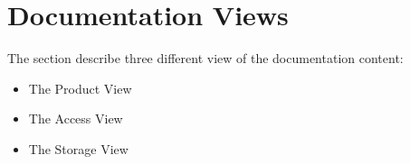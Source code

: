 \section{Documentation Views}
\label{sec:views}

The section describe three different view of the documentation content:

\begin{itemize}

\item The Product View
\item The Access View
\item The Storage View

\end{itemize}
 
